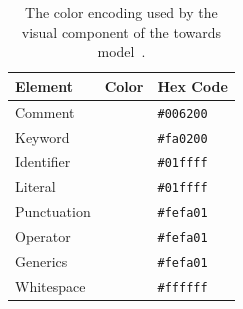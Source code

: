 \documentclass[%
class=scrreprt,
chapterprefix=false,%
open=right,%
twoside=false,%
paper=a4,%
logofile={Logo\_zentral\_farbig\_EN.png},%
thesistype=master,%
UKenglish,%
]{se2thesis}
\theoremstyle{definition}
\begin{document}
	\begin{table}[h]
		\centering
		\caption{The color encoding used by the visual component of the towards model~\cite{mi2022towards}.}
		\vspace{8pt}
		\label{tab:model-colors}
		\begin{tabular}{lll}
			\toprule
			Element & Color & Hex Code \\
			\midrule
			Comment & \cellcolor{CommentColor} & \texttt{\#006200} \\
			Keyword & \cellcolor{KeywordColor} & \texttt{\#fa0200} \\
			Identifier & \cellcolor{IdentifierColor} & \texttt{\#01ffff} \\
			Literal & \cellcolor{LiteralColor} & \texttt{\#01ffff} \\
			Punctuation & \cellcolor{PunctuationColor} & \texttt{\#fefa01} \\
			Operator & \cellcolor{OperatorColor} & \texttt{\#fefa01} \\
			Generics & \cellcolor{GenericsColor} & \texttt{\#fefa01} \\
			Whitespace & \cellcolor{WhitespaceColor} & \texttt{\#ffffff} \\
			\bottomrule
		\end{tabular}
	\end{table}
	
%	
	
\end{document}
